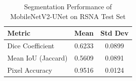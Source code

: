 
\begin{table}[h]
\centering
\caption{Segmentation Performance of MobileNetV2-UNet on RSNA Test Set}
\begin{tabular}{lcc}
\hline
\textbf{Metric} & \textbf{Mean} & \textbf{Std Dev} \\
\hline
Dice Coefficient & 0.6233 & 0.0899 \\
Mean IoU (Jaccard) & 0.5609 & 0.0891 \\
Pixel Accuracy & 0.9516 & 0.0124 \\
\hline
\end{tabular}
\label{tab:seg_results}
\end{table}
